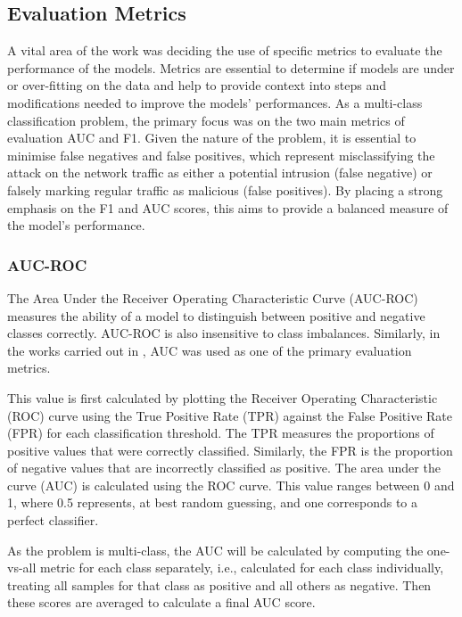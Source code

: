 \subsection{Evaluation Metrics}

A vital area of the work was deciding the use of specific metrics to evaluate the performance of the models. Metrics are essential to determine if models are under or over-fitting on the data and help to provide context into steps and modifications needed to improve the models' performances. 
As a multi-class classification problem, the primary focus was on the two main metrics of evaluation AUC and F1. Given the nature of the problem, it is essential to minimise false negatives and false positives, which represent misclassifying the attack on the network traffic as either a potential intrusion (false negative) or falsely marking regular traffic as malicious (false positives). By placing a strong emphasis on the F1 and AUC scores, this aims to provide a balanced measure of the model's performance.


\subsubsection*{AUC-ROC}

The Area Under the Receiver Operating Characteristic Curve (AUC-ROC) measures the ability of a model to distinguish between positive and negative classes correctly. AUC-ROC is also insensitive to class imbalances. Similarly, in the works carried out in \parencite{s22155633, pick_quality_over}, AUC was used as one of the primary evaluation metrics.

\medskip

This value is first calculated by plotting the Receiver Operating Characteristic (ROC) curve using the True Positive Rate (TPR) against the False Positive Rate (FPR) for each classification threshold. The TPR measures the proportions of positive values that were correctly classified. Similarly, the FPR is the proportion of negative values that are incorrectly classified as positive. The area under the curve (AUC) is calculated using the ROC curve. This value ranges between 0 and 1, where 0.5 represents, at best random guessing, and one corresponds to a perfect classifier.

\medskip

As the problem is multi-class, the AUC will be calculated by computing the one-vs-all metric for each class separately, i.e.,  calculated for each class individually, treating all samples for that class as positive and all others as negative. Then these scores are averaged to calculate a final AUC score.


